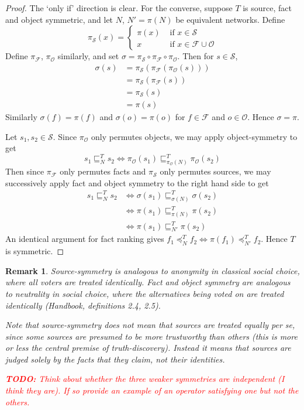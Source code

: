 \documentclass{article}
\theoremstyle{definition} \newtheorem{definition}{Definition}
\theoremstyle{definition} \newtheorem{example}{Example}
\theoremstyle{plain} \newtheorem{axiom}{Axiom}
\theoremstyle{plain} \newtheorem*{remark}{Remark}
\theoremstyle{remark} \newtheorem*{notation}{Notation}
\theoremstyle{plain} \newtheorem{lemma}{Lemma}
\theoremstyle{plain} \newtheorem{proposition}{Proposition}
\newcommand{\todo}[1] {
    \textcolor{red}{
        \textbf{TODO:} #1
    }
}
\renewcommand{\S}{\mathcal{S}}  %
\renewcommand{\O}{\mathcal{O}}  %
\newcommand{\F}{\mathcal{F}}
\newcommand{\sle}{\sqsubseteq}
\newcommand{\fle}{\preceq}
\begin{document}
\begin{proof}
The `only if' direction is clear. For the converse, suppose $T$ is source, fact
and object symmetric, and let $N$, $N'=\pi(N)$ be equivalent networks. Define
\begin{equation*}
\pi_\S(x) = \begin{cases}
    \pi(x) & \text{ if } x \in \S \\
    x      & \text{ if } x \in \F \cup \O
\end{cases}
\end{equation*}
Define $\pi_\F$, $\pi_\O$ similarly, and set $\sigma = \pi_\S \circ \pi_\F
\circ \pi_\O$. Then for $s \in \S$,
\begin{align*}
\sigma(s) &= \pi_\S(\pi_\F(\pi_\O(s))) \\
          &= \pi_\S(\pi_\F(s)) \\
          &= \pi_\S(s) \\
          &= \pi(s)
\end{align*}
Similarly $\sigma(f)=\pi(f)$ and $\sigma(o)=\pi(o)$ for $f \in \F$ and $o \in
\O$. Hence $\sigma=\pi$.

Let $s_1, s_2 \in \S$. Since $\pi_\O$ only permutes objects, we may apply
object-symmetry to get
$$ s_1 \sle_N^T s_2 \iff \pi_\O(s_1) \sle_{\pi_\O(N)}^T \pi_\O(s_2) $$
Then since $\pi_\F$ only permutes facts and $\pi_\S$ only permutes sources, we
may successively apply fact and object symmetry to the right hand side to get
\begin{align*}
s_1 \sle_N^T s_2 & \iff \sigma(s_1) \sle_{\sigma(N)}^T \sigma(s_2) \\
                 & \iff \pi(s_1) \sle_{\pi(N)}^T \pi(s_2) \\
                 & \iff \pi(s_1) \sle_{N'}^T \pi(s_2)
\end{align*}
An identical argument for fact ranking gives $f_1 \fle_N^T f_2 \iff \pi(f_1)
\fle_{N'}^T f_2$. Hence $T$ is symmetric.

\end{proof}

\begin{remark}
Source-symmetry is analogous to \emph{anonymity} in classical social choice,
where all voters are treated identically. Fact and object symmetry are
analogous to \emph{neutrality} in social choice, where the alternatives being
voted on are treated identically (Handbook, definitions 2.4, 2.5).

Note that source-symmetry does not mean that sources are treated \emph{equally}
per se, since some sources are presumed to be more trustworthy than others
(this is more or less the central premise of truth-discovery). Instead it means
that sources are judged solely by the facts that they claim, not their
identities.

\todo{Think about whether the three weaker symmetries are independent (I think
they are). If so provide an example of an operator satisfying one but not the
others.}
\end{remark}
\end{document}
